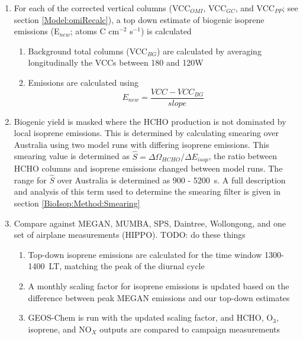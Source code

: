 \begin{enumerate}
\begin{enumerate}
      \end{enumerate}
      \item For each of the corrected vertical columns (VCC$_{OMI}$, VCC$_{GC}$, and VCC$_{PP}$; see section \ref{Model:omiRecalc}), a top down estimate of biogenic isoprene emissions (E$_{new}$; atoms C cm$^{-2}$ s$^{-1}$) is calculated
      \begin{enumerate}
        \item 
          Background total columns (VCC$_{BG}$) are calculated by averaging longitudinally the VCCs between 180 and 120\degr W
        \item
          Emissions are calculated using 
          \begin{equation} \label{BioIsop:Method:eqn_Enew}
            E_{new} = \frac{VCC - VCC_{BG}}{slope}
          \end{equation}
      \end{enumerate}
      \item
        Biogenic yield is masked where the HCHO production is not dominated by local isoprene emissions. 
        This is determined by calculating smearing over Australia using two model runs with differing isoprene emissions.
        This smearing value is determined as $\hat{S}=\Delta \Omega_{HCHO}/ \Delta E_{isop}$, the ratio between HCHO columns and isoprene emissions changed between model runs.
        The range for $\hat{S}$ over Australia is determined as 900 - 5200~s.
        A full description and analysis of this term used to determine the smearing filter is given in section \ref{BioIsop:Method:Smearing}
      \item 
        Compare against MEGAN, MUMBA, SPS, Daintree, Wollongong, and one set of airplane measurements (HIPPO).
        TODO: do these things
      \begin{enumerate}
        \item Top-down isoprene emissions are calculated for the time window 1300-1400~LT, matching the peak of the diurnal cycle
        \item A monthly scaling factor for isoprene emissions is updated based on the difference between peak MEGAN emissions and our top-down estimates
        \item GEOS-Chem is run with the updated scaling factor, and HCHO, O$_3$, isoprene, and NO$_X$ outputs are compared to campaign measurements
      \end{enumerate}
    \end{enumerate}
    
